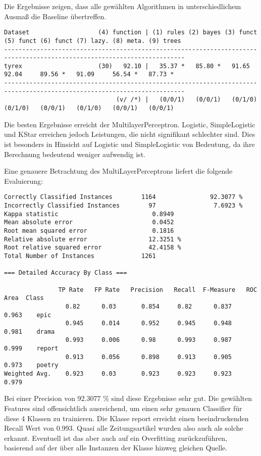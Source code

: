 \documentclass[]{article}
\begin{document}
Die Ergebnisse zeigen, dass alle gewählten Algorithmen in
unterschiedlichem Ausmaß die Baseline übertreffen.

\begin{verbatim}
Dataset                   (4) function | (1) rules (2) bayes (3) funct (5) funct (6) funct (7) lazy. (8) meta. (9) trees
------------------------------------------------------------------------------------------------------------------------
tyrex                     (30)   92.10 |   35.37 *   85.80 *   91.65     92.04     89.56 *   91.09     56.54 *   87.73 *
------------------------------------------------------------------------------------------------------------------------
                               (v/ /*) |   (0/0/1)   (0/0/1)   (0/1/0)   (0/1/0)   (0/0/1)   (0/1/0)   (0/0/1)   (0/0/1)
\end{verbatim}

Die besten Ergebnisse erreicht der MultilayerPerceptron. Logistic,
SimpleLogistic und KStar erreichen jedoch Leistungen, die nicht
signifikant schlechter sind. Dies ist besonders in Hinsicht auf Logistic
und SimpleLogistic von Bedeutung, da ihre Berechnung bedeutend weniger
aufwendig ist.

Eine genauere Betrachtung des MultiLayerPerceptrons liefert die folgende
Evaluierung:

\begin{verbatim}
Correctly Classified Instances        1164               92.3077 %
Incorrectly Classified Instances        97                7.6923 %
Kappa statistic                          0.8949
Mean absolute error                      0.0452
Root mean squared error                  0.1816
Relative absolute error                 12.3251 %
Root relative squared error             42.4158 %
Total Number of Instances             1261     

=== Detailed Accuracy By Class ===

               TP Rate   FP Rate   Precision   Recall  F-Measure   ROC Area  Class
                 0.82      0.03       0.854     0.82      0.837      0.963    epic
                 0.945     0.014      0.952     0.945     0.948      0.981    drama
                 0.993     0.006      0.98      0.993     0.987      0.999    report
                 0.913     0.056      0.898     0.913     0.905      0.973    poetry
Weighted Avg.    0.923     0.03       0.923     0.923     0.923      0.979
\end{verbatim}

Bei einer Precision von 92.3077 \% sind diese Ergebnisse sehr gut. Die
gewählten Features sind offensichtlich ausreichend, um einen sehr
genauen Classifier für diese 4 Klassen zu trainieren. Die Klasse report
erreicht einen beeindruckenden Recall Wert von 0.993. Quasi alle
Zeitungsartikel wurden also auch als solche erkannt. Eventuell ist das
aber auch auf ein Overfitting zurückzuführen, basierend auf der über
alle Instanzen der Klasse hinweg gleichen Quelle.
\end{document}
